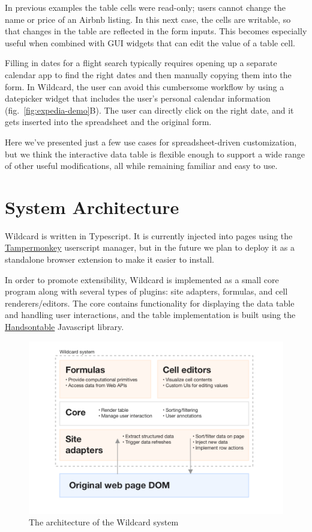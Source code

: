 \documentclass[english,submission]{programming}
\begin{document}
In previous examples the table cells were read-only; users cannot change
the name or price of an Airbnb listing. In this next case, the cells are
writable, so that changes in the table are reflected in the form inputs.
This becomes especially useful when combined with GUI widgets that can
edit the value of a table cell.

Filling in dates for a flight search typically requires opening up a
separate calendar app to find the right dates and then manually copying
them into the form. In Wildcard, the user can avoid this cumbersome
workflow by using a datepicker widget that includes the user's personal
calendar information{ (fig.~\ref{fig:expedia-demo}B)}. The user can
directly click on the right date, and it gets inserted into the
spreadsheet and the original form.

Here we've presented just a few use cases for spreadsheet-driven
customization, but we think the interactive data table is flexible
enough to support a wide range of other useful modifications, all while
remaining familiar and easy to use.

\hypertarget{system-architecture}{%
\section{System Architecture}\label{system-architecture}}

Wildcard is written in Typescript. It is currently injected into pages
using the \href{https://www.tampermonkey.net/}{Tampermonkey} userscript
manager, but in the future we plan to deploy it as a standalone browser
extension to make it easier to install.

In order to promote extensibility, Wildcard is implemented as a small
core program along with several types of plugins: site adapters,
formulas, and cell renderers/editors. The core contains functionality
for displaying the data table and handling user interactions, and the
table implementation is built using the
\href{https://handsontable.com/}{Handsontable} Javascript library.

\begin{figure}
\hypertarget{fig:architecture}{%
\centering
\includegraphics{media/architecture-clean.png}
\caption{The architecture of the Wildcard
system}\label{fig:architecture}
}
\end{figure}
\end{document}
